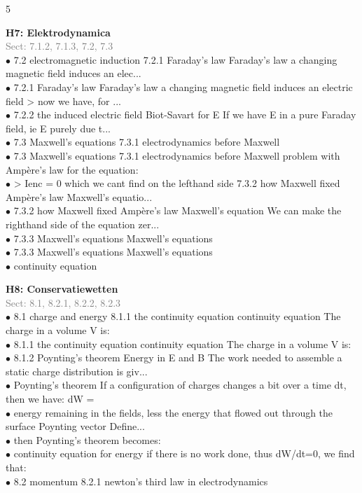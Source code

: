 \documentclass[7pt,a4paper]{article}
\begin{document}
\begin{multicols*}{5}


\textbf{H7: Elektrodynamica}\\\textcolor{gray}{{Sect: 7.1.2, 7.1.3, 7.2, 7.3}}\\\vspace{0.5pt}
$\bullet$ 7.2 electromagnetic induction
7.2.1 Faraday's law
Faraday's law a changing magnetic field induces an elec...\\
$\bullet$ 7.2.1 Faraday's law
Faraday's law a changing magnetic field induces an electric field
> now we have, for ...\\
$\bullet$ 7.2.2 the induced electric field
Biot-Savart for E If we have E in a pure Faraday field, ie E purely due t...\\
$\bullet$ 7.3 Maxwell's equations
7.3.1 electrodynamics before Maxwell\\
$\bullet$ 7.3 Maxwell's equations
7.3.1 electrodynamics before Maxwell
problem with Ampère's law for the equation:\\
$\bullet$ > Ienc = 0 which we cant find on the lefthand side
7.3.2 how Maxwell fixed Ampère's law
Maxwell's equatio...\\
$\bullet$ 7.3.2 how Maxwell fixed Ampère's law
Maxwell's equation We can make the righthand side of the equation zer...\\
$\bullet$ 7.3.3 Maxwell's equations
Maxwell's equations\\
$\bullet$ 7.3.3 Maxwell's equations
Maxwell's equations\\
$\bullet$ continuity equation\\
\columnbreak

\textbf{H8: Conservatiewetten}\\\textcolor{gray}{{Sect: 8.1, 8.2.1, 8.2.2, 8.2.3}}\\\vspace{0.5pt}
$\bullet$ 8.1 charge and energy
8.1.1 the continuity equation
continuity equation The charge in a volume V is:\\
$\bullet$ 8.1.1 the continuity equation
continuity equation The charge in a volume V is:\\
$\bullet$ 8.1.2 Poynting's theorem
Energy in E and B The work needed to assemble a static charge distribution is giv...\\
$\bullet$ Poynting's theorem If a configuration of charges changes a bit over a time dt, then we have:
  dW =\\
$\bullet$ energy remaining in the fields, less the energy that flowed out through the surface
Poynting vector Define...\\
$\bullet$ then Poynting's theorem becomes:\\
$\bullet$ continuity equation for energy if there is no work done, thus dW/dt=0, we find that:\\
$\bullet$ 8.2 momentum
8.2.1 newton's third law in electrodynamics\\
\columnbreak


\end{multicols*}
\end{document}
